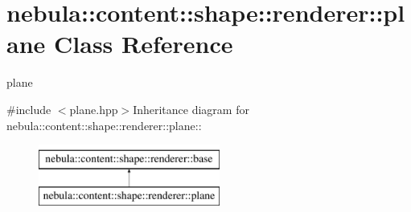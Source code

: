 \hypertarget{classnebula_1_1content_1_1shape_1_1renderer_1_1plane}{
\section{nebula::content::shape::renderer::plane Class Reference}
\label{classnebula_1_1content_1_1shape_1_1renderer_1_1plane}
}


plane  


{\ttfamily \#include $<$plane.hpp$>$}Inheritance diagram for nebula::content::shape::renderer::plane::\begin{figure}[H]
\begin{center}
\leavevmode
\includegraphics[height=2cm]{classnebula_1_1content_1_1shape_1_1renderer_1_1plane}
\end{center}
\end{figure}
